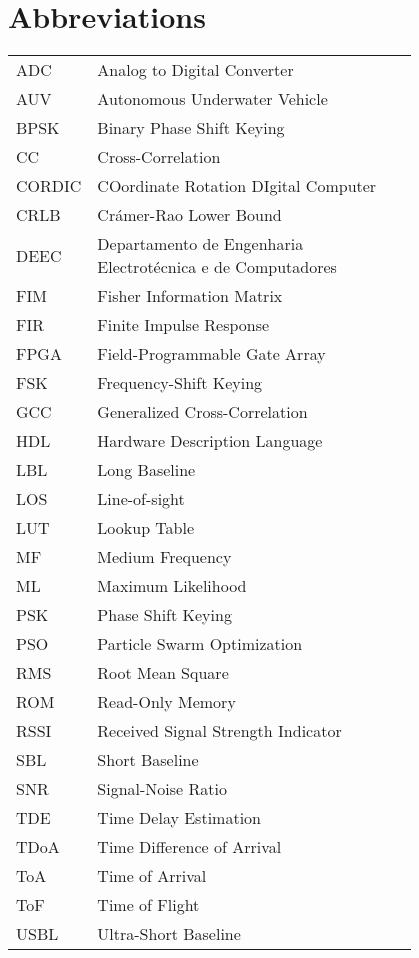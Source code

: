\chapter*{Abbreviations}

\begin{flushleft}
\begin{tabular}{l p{0.8\linewidth}}
ADC	    	 & Analog to Digital Converter \\
AUV			 & Autonomous Underwater Vehicle \\
BPSK    	& Binary Phase Shift Keying \\
CC 		  		& Cross-Correlation \\
CORDIC 	 & COordinate Rotation DIgital Computer \\
CRLB		& Crámer-Rao Lower Bound \\
DEEC		& Departamento de Engenharia Electrotécnica e de Computadores \\
FIM		  	& Fisher Information Matrix \\
FIR 	   	& Finite Impulse Response \\
FPGA    & Field-Programmable Gate Array \\
FSK		  & Frequency-Shift Keying \\
GCC      & Generalized Cross-Correlation \\
HDL		 & Hardware Description Language\\
LBL		  & Long Baseline\\
LOS		 & Line-of-sight\\
LUT     & Lookup Table \\
MF		  & Medium Frequency \\
ML		  & Maximum Likelihood \\
PSK		& Phase Shift Keying \\
PSO		& Particle Swarm Optimization \\
RMS		 & Root Mean Square \\
ROM     & Read-Only Memory \\
RSSI 	  & Received Signal Strength Indicator \\
SBL		  & Short Baseline \\
SNR		 & Signal-Noise Ratio\\
TDE 	 & Time Delay Estimation \\
TDoA    & Time Difference of Arrival \\
ToA	   	& Time of Arrival \\
ToF		 & Time of Flight \\
USBL    & Ultra-Short Baseline
\end{tabular}
\end{flushleft}